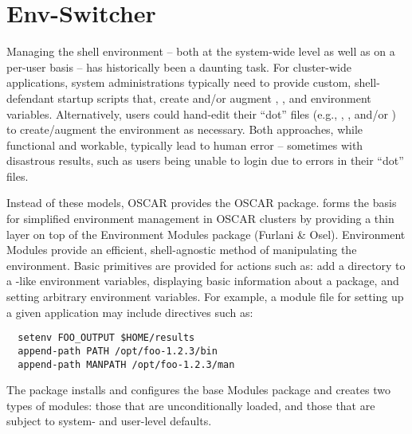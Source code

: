 %
%
%
%
%
%

\section{Env-Switcher}
\label{sect:switcher}

Managing the shell environment -- both at the system-wide level as
well as on a per-user basis -- has historically been a daunting task.
For cluster-wide applications, system administrations typically need
to provide custom, shell-defendant startup scripts that, create and/or
augment , , and
 environment variables.
%
Alternatively, users could hand-edit their ``dot'' files (e.g.,
, , and/or
) to create/augment the environment as necessary.
%
Both approaches, while functional and workable, typically lead to
human error -- sometimes with disastrous results, such as users being
unable to login due to errors in their ``dot'' files.

Instead of these models, OSCAR provides the 
OSCAR package.  forms the basis for simplified
environment management in OSCAR clusters by providing a thin layer on
top of the Environment Modules
package (Furlani \& Osel).
Environment Modules provide an efficient, shell-agnostic method of
manipulating the environment.  Basic primitives are provided for
actions such as: add a directory to a -like environment
variables, displaying basic information about a package, and setting
arbitrary environment variables.  For example, a module file for
setting up a given application may include directives such as:
%
\begin{verbatim}
  setenv FOO_OUTPUT $HOME/results
  append-path PATH /opt/foo-1.2.3/bin
  append-path MANPATH /opt/foo-1.2.3/man
\end{verbatim}
%
The  package installs and configures the base
Modules package and creates two types of modules: those that are
unconditionally loaded, and those that are subject to system- and
user-level defaults.

